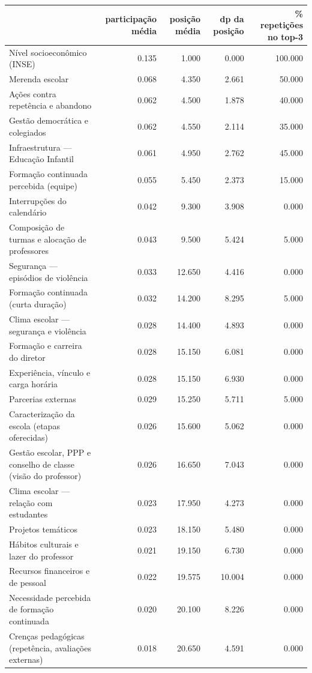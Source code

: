 \begin{tabular}{lrrrr}
\toprule
 & participação média & posição média & dp da posição & \% repetições no top-3 \\
\midrule
Nível socioeconômico (INSE) & 0.135 & 1.000 & 0.000 & 100.000 \\
Merenda escolar & 0.068 & 4.350 & 2.661 & 50.000 \\
Ações contra repetência e abandono & 0.062 & 4.500 & 1.878 & 40.000 \\
Gestão democrática e colegiados & 0.062 & 4.550 & 2.114 & 35.000 \\
Infraestrutura — Educação Infantil & 0.061 & 4.950 & 2.762 & 45.000 \\
Formação continuada percebida (equipe) & 0.055 & 5.450 & 2.373 & 15.000 \\
Interrupções do calendário & 0.042 & 9.300 & 3.908 & 0.000 \\
Composição de turmas e alocação de professores & 0.043 & 9.500 & 5.424 & 5.000 \\
Segurança — episódios de violência & 0.033 & 12.650 & 4.416 & 0.000 \\
Formação continuada (curta duração) & 0.032 & 14.200 & 8.295 & 5.000 \\
Clima escolar — segurança e violência & 0.028 & 14.400 & 4.893 & 0.000 \\
Formação e carreira do diretor & 0.028 & 15.150 & 6.081 & 0.000 \\
Experiência, vínculo e carga horária & 0.028 & 15.150 & 6.930 & 0.000 \\
Parcerias externas & 0.029 & 15.250 & 5.711 & 5.000 \\
Caracterização da escola (etapas oferecidas) & 0.026 & 15.600 & 5.062 & 0.000 \\
Gestão escolar, PPP e conselho de classe (visão do professor) & 0.026 & 16.650 & 7.043 & 0.000 \\
Clima escolar — relação com estudantes & 0.023 & 17.950 & 4.273 & 0.000 \\
Projetos temáticos & 0.023 & 18.150 & 5.480 & 0.000 \\
Hábitos culturais e lazer do professor & 0.021 & 19.150 & 6.730 & 0.000 \\
Recursos financeiros e de pessoal & 0.022 & 19.575 & 10.004 & 0.000 \\
Necessidade percebida de formação continuada & 0.020 & 20.100 & 8.226 & 0.000 \\
Crenças pedagógicas (repetência, avaliações externas) & 0.018 & 20.650 & 4.591 & 0.000 \\

\end{tabular}

